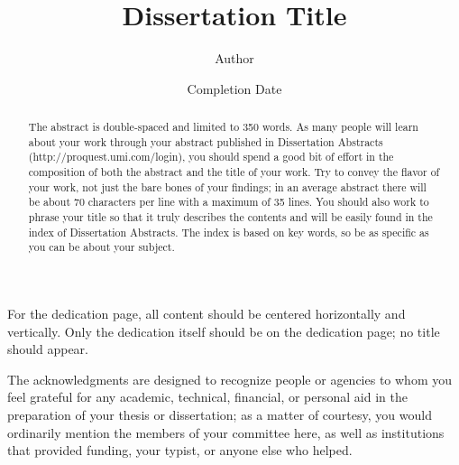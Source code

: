 \documentclass{iuphd}
\begin{document}
\title{Dissertation Title}
\author{Author}
\date{Completion Date}
\maketitle

\acceptancepage

\copyrightpage

\begin{dedication}
For the dedication page, all content should be centered horizontally and vertically. Only the dedication itself should be on the dedication page; no title should appear. 
\end{dedication}

\begin{acknowledgments}
The acknowledgments are designed to recognize people or agencies to whom you feel grateful for any academic,
technical, financial, or personal aid in the preparation of your thesis or dissertation; as a matter of
courtesy, you would ordinarily mention the members of your committee here, as well as institutions that
provided funding, your typist, or anyone else who helped.
\end{acknowledgments}


\begin{abstract}
 The abstract is double-spaced and limited to 350 words. As many people will learn about
your work through your abstract published in Dissertation Abstracts (http://proquest.umi.com/login),
you should spend a good bit of effort in the composition of both the abstract and the title of your work.
Try to convey the flavor of your work, not just the bare bones of your findings; in an average abstract
there will be about 70 characters per line with a maximum of 35 lines. You should also work to phrase your
title so that it truly describes the contents and will be easily found in the index of Dissertation Abstracts.
The index is based on key words, so be as specific as you can be about your subject. 
\end{abstract}

\tableofcontents






% 
% 
\end{document}
